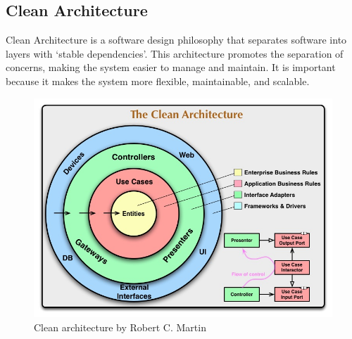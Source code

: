 \subsection{Clean Architecture}
Clean Architecture is a software design philosophy that separates software into layers with ‘stable dependencies’. This architecture promotes the separation of concerns, making the system easier to manage and maintain. It is important because it makes the system more flexible, maintainable, and scalable.
\begin{figure}[H]
    \centering
    \includegraphics[width=.84\linewidth]{../images/clean-architecture-by-robert-c-martin.jpg}
    \caption{Clean architecture by Robert C. Martin \cite{unclebob2023}}\label{Fig:CABRMARTIN}
\end{figure}
